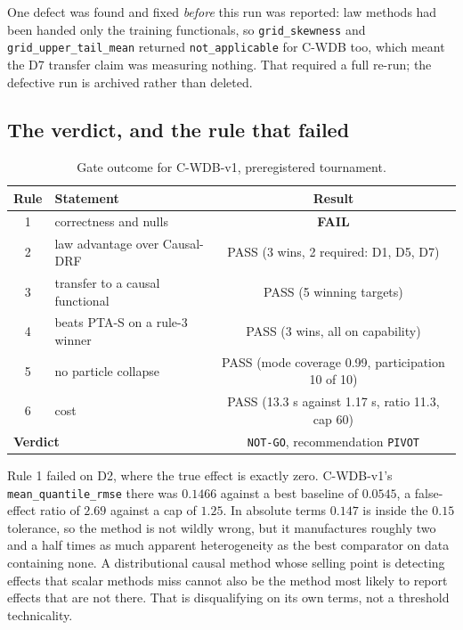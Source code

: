 \documentclass[11pt,a4paper]{article}
\theoremstyle{definition}
\theoremstyle{remark}
\newcommand{\CWDB}{\textsf{C-WDB}}
\begin{document}
One defect was found and fixed \emph{before} this run was reported: law methods
had been handed only the training functionals, so \texttt{grid\_skewness} and
\texttt{grid\_upper\_tail\_mean} returned \texttt{not\_applicable} for \CWDB{}
too, which meant the D7 transfer claim was measuring nothing. That required a
full re-run; the defective run is archived rather than deleted.

\subsection{The verdict, and the rule that failed}

\begin{table}[htbp]
\centering
\caption{Gate outcome for C-WDB-v1, preregistered tournament.}
\label{tab:gate1}
\small
\begin{tabular}{@{}clc@{}}
\toprule
Rule & Statement & Result \\
\midrule
1 & correctness and nulls & \textbf{FAIL} \\
2 & law advantage over Causal-DRF & PASS (3 wins, 2 required: D1, D5, D7) \\
3 & transfer to a causal functional & PASS (5 winning targets) \\
4 & beats PTA-S on a rule-3 winner & PASS (3 wins, all on capability) \\
5 & no particle collapse & PASS (mode coverage 0.99, participation 10 of 10) \\
6 & cost & PASS (13.3 s against 1.17 s, ratio 11.3, cap 60) \\
\midrule
\multicolumn{2}{l}{\textbf{Verdict}} & \texttt{NOT-GO}, recommendation \texttt{PIVOT} \\
\bottomrule
\end{tabular}
\end{table}

Rule 1 failed on D2, where the true effect is exactly zero. C-WDB-v1's
\texttt{mean\_quantile\_rmse} there was $0.1466$ against a best baseline of
$0.0545$, a false-effect ratio of $2.69$ against a cap of $1.25$. In absolute
terms $0.147$ is inside the $0.15$ tolerance, so the method is not wildly wrong,
but it manufactures roughly two and a half times as much apparent heterogeneity
as the best comparator on data containing none. A distributional causal method
whose selling point is detecting effects that scalar methods miss cannot also be
the method most likely to report effects that are not there. That is
disqualifying on its own terms, not a threshold technicality.
\end{document}
